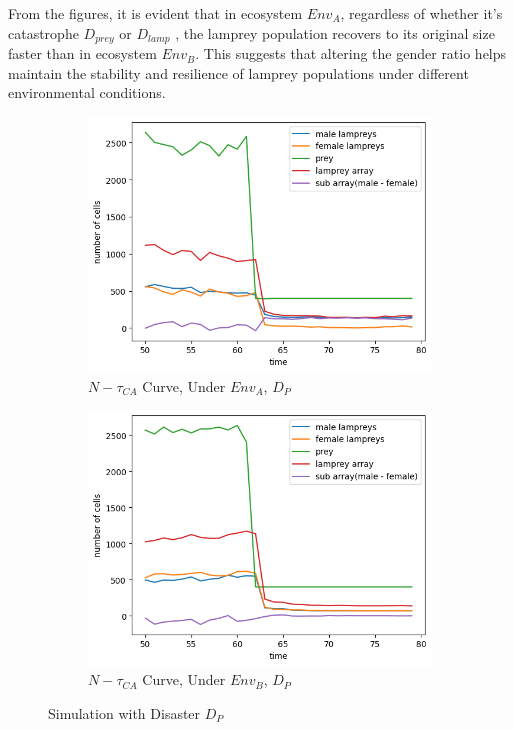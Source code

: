 \documentclass{mcmthesis}
\begin{document}
From the figures, it is evident that in ecosystem $Env_{A}$, regardless of whether it's catastrophe $D_{prey}$ or $D_{lamp}$ , the lamprey population recovers to its original size faster than in ecosystem $Env_{B}$. This suggests that altering the gender ratio helps maintain the stability and resilience of lamprey populations under different environmental conditions.


\begin{figure}[H]
  \centering
  \begin{subfigure}[b]{0.45\textwidth}
    \includegraphics[width=\textwidth]{figures/6_2_figur5.png}
    \caption{$N-\tau_{CA}$ Curve, Under $Env_{A}$, $D_{P}$}
    \label{fig:sub1}
  \end{subfigure}
  \hfill
  \begin{subfigure}[b]{0.45\textwidth}
    \includegraphics[width=\textwidth]{figures/6_2_figur6.png}
    \caption{$N-\tau_{CA}$ Curve, Under $Env_{B}$, $D_{P}$}
    \label{fig:sub2}
  \end{subfigure}

  \caption{Simulation with Disaster $D_{P}$}
  \label{fig:Simulation of Disaster}
\end{figure}
\end{document}
